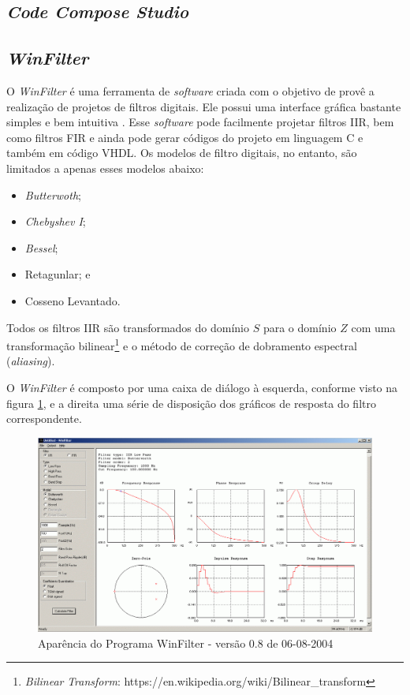 	\subsection{\textit{Code Compose Studio}}
	
	\subsection{\textit{WinFilter}}
	
		O \textit{WinFilter} é uma ferramenta de \textit{software} criada com o objetivo de provê a realização de projetos de filtros digitais. Ele possui uma interface gráfica bastante simples e bem intuitiva \cite{Kundert2004}. Esse \textit{software} pode facilmente projetar filtros IIR, bem como filtros FIR e ainda pode gerar códigos do projeto em linguagem C e também em código VHDL. Os modelos de filtro digitais, no entanto, são limitados a apenas esses modelos abaixo:
		
		\begin{itemize}
			\item \textit{Butterwoth};
			\item \textit{Chebyshev I};
			\item \textit{Bessel};
			\item Retagunlar; e
			\item Cosseno Levantado.
		\end{itemize}
		
		Todos os filtros IIR são transformados do domínio $ S $ para o domínio $ Z $ com uma transformação bilinear\footnote{\textit{Bilinear} \textit{Transform}: https://en.wikipedia.org/wiki/Bilinear\_transform} e o método de correção de dobramento espectral (\textit{aliasing}).
	
		O \textit{WinFilter} é composto por uma caixa de diálogo à esquerda, conforme visto na figura \ref{fig-winfilter-window}, e a direita uma série de disposição dos gráficos de resposta do filtro correspondente.
		
		\begin{figure}[!ht]
			\label{fig-winfilter-window}
			\centering
			\includegraphics[scale=0.3]{./figuras/winfilterwindow.png}
			\caption{Aparência do Programa WinFilter - versão 0.8 de  06-08-2004}
		\end{figure}
	
